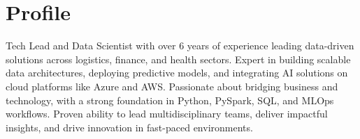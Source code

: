 \section*{Profile}
\noindent
Tech Lead and Data Scientist with over 6 years of experience leading data-driven solutions across logistics, finance, and health sectors. Expert in building scalable data architectures, deploying predictive models, and integrating AI solutions on cloud platforms like Azure and AWS. Passionate about bridging business and technology, with a strong foundation in Python, PySpark, SQL, and MLOps workflows. Proven ability to lead multidisciplinary teams, deliver impactful insights, and drive innovation in fast-paced environments.
